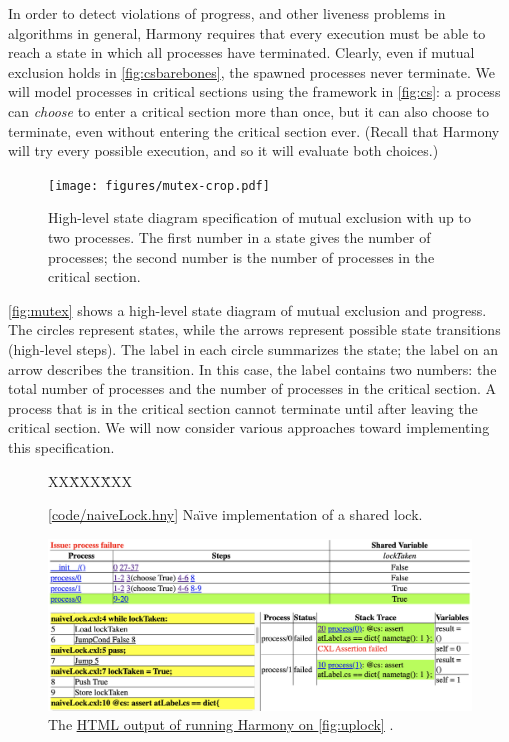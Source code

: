 \documentclass{report}
\newcommand{\harmonysource}[1]{
\begin{tabbing}
XX\=XXX\=XXX\kill
    
\end{tabbing}
}
\newcommand{\harmonylink}[1]{%
[\href{https://www.cs.cornell.edu/home/rvr/harmony/#1}{\underline{#1}}]%
}
\newcommand{\harmonyref}[2]{%
\href{https://www.cs.cornell.edu/home/rvr/harmony/output/#1}{\underline{#2}}%
}
\newenvironment{code}{
\tcolorbox
}{
\endtcolorbox
}
\begin{document}
In order to detect violations of progress, and other liveness problems in
algorithms in general, Harmony requires that every execution must be
able to reach a state in which all processes have terminated.
Clearly, even if mutual exclusion holds in \autoref{fig:csbarebones},
the spawned processes never terminate.  We
will model processes in critical sections using the framework in
\autoref{fig:cs}: a process can \emph{choose} to enter a
critical section more than once, but it can also choose to terminate, even
without entering the critical section ever.
(Recall that Harmony will try every possible execution, and so it will evaluate
both choices.)

\begin{figure}
\begin{center}
\texttt{[image: figures/mutex-crop.pdf]}
\end{center}
\caption{High-level state diagram specification of mutual exclusion with up to two processes.
The first number in a state gives the number of processes; the second number is the
number of processes in the critical section.}
\label{fig:mutex}
\end{figure}

\autoref{fig:mutex} shows a high-level state diagram
 of mutual exclusion and progress.%
The circles represent states, while the arrows represent possible state
transitions (high-level steps).  The label in each circle summarizes the state;
the label on an arrow describes the transition.  In this case,
the label contains two numbers: the total number of processes and the number
of processes in the critical section.  A process that is in the critical
section cannot terminate until after leaving the critical section.
We will now consider various approaches toward implementing this
specification.

\begin{figure}
\begin{code}
\harmonysource{naiveLock}
\end{code}
\caption{\harmonylink{code/naiveLock.hny} Na\"{\i}ve implementation of a shared lock.}
\label{fig:uplock}
\end{figure}

\begin{figure}
\includegraphics[width=\textwidth]{figures/naiveLock.png}
\caption{The \harmonyref{naiveLock.html}{HTML output of running Harmony on \autoref{fig:uplock}}.}
\label{fig:naiveLockhtml}
\end{figure}
\end{document}
